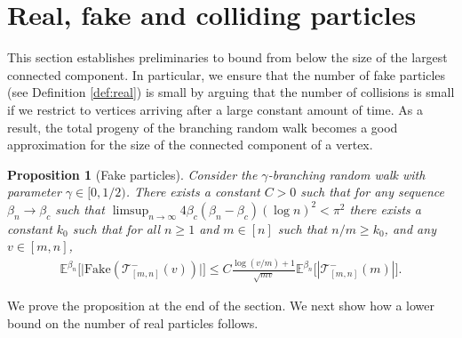 \documentclass[a4paper, a4wide, 10pt, reqno]{amsart}
\theoremstyle{plain}
\newtheorem{proposition}[theorem]{Proposition}
\theoremstyle{definition}
\numberwithin{equation}{section}
\newcommand{\E}{\mathbb E}
\newcommand{\sT}{{\mathscr T}}
\begin{document}
\section{Real, fake and colliding particles}\label{sec:real}
This section establishes preliminaries to bound from below the size of the largest connected component. In particular, we ensure that the number of fake particles (see Definition \ref{def:real}) is small by arguing that the number of collisions is small if we restrict to vertices arriving after a large constant amount of time. As a result, the total progeny of the branching random walk becomes a good approximation for the size of the connected component of a vertex.
\begin{proposition}[Fake particles]\label{prop:fake}
    Consider the $\gamma$-branching random walk with parameter $\gamma\in[0, 1/2)$. There exists a constant $C>0$ such that for any sequence  $\beta_n\to\beta_c$ such that $\limsup_{n\to\infty}4\beta_c(\beta_n-\beta_c)(\log n)^2<\pi^2$ there exists a constant $k_0$  such that for all $n\ge 1$ and $m\in[n]$ such that $n/m\ge k_0$, and any $v\in[m,n]$,
    \begin{equation}
    \begin{aligned}
        \E^{\beta_n}\Big[\big|\mathrm{Fake}(\sT_{[m,n]}^-(v))\big|\Big] 
        \le C\frac{\log(v/m)+1}{\sqrt{mv}}\E^{\beta_n}\Big[|\sT_{[m,n]}^-(m)|\Big].  
        \end{aligned}
    \end{equation}
\end{proposition}
We prove the proposition at the end of the section. We next show how a lower bound on the number of real particles follows.
\end{document}
